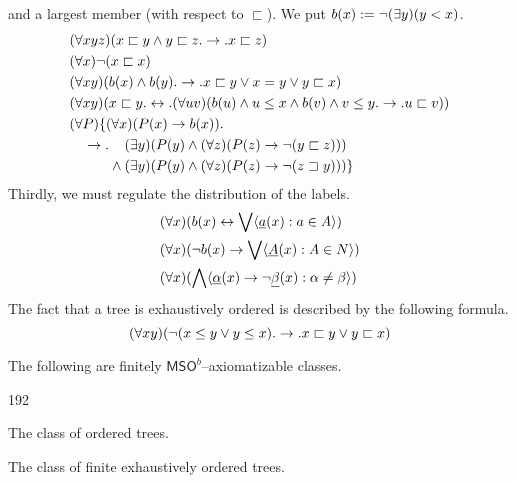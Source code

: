 and a largest member (with respect to $\sqsubset$).
We put $b(x) := \neg (\exists y)(y < x)$.
\begin{subequations}
\begin{align}
& (\forall xyz)(x \sqsubset y \und y \sqsubset z. \pf .x \sqsubset z) \\
& (\forall x)\nicht (x \sqsubset x) \\
& (\forall xy)(b(x) \und b(y) .\pf.
    x \sqsubset y \oder x \doteq y \oder y \sqsubset x) \\
& (\forall xy)(x \sqsubset y. \dpf .
    (\forall uv)(b(u) \und u \leq x \und b(v) \und v \leq y.
    \pf .u \sqsubset v)) 
\\
& (\forall P)\{(\forall x)(P(x) \pf b(x)).  \\\notag
& \quad \pf. \phantom{\mbox{}\und\mbox{}}
    (\exists y)(P(y) \und (\forall z)(P(z) \pf
    \nicht (y \sqsubset z))) \\\notag
& \quad \phantom{\mbox{}\pf. \mbox{}}
    \und (\exists y)(P(y) \und (\forall z)(P(z) \pf
    \nicht (z \sqsupset y)))\}
\end{align}
\end{subequations}
Thirdly,  we must regulate the distribution of the labels.
\begin{subequations}
\begin{align}
& (\forall x)(b(x) \leftrightarrow \bigvee \langle \underline{a}(x) : a \in A\rangle) \\
& (\forall x)(\neg b(x) \rightarrow \bigvee \langle \underline{A}(x) : A \in N\rangle) \\
& (\forall x)(\bigwedge \langle \underline{\alpha}(x) \rightarrow \neg \underline{\beta}(x)
    : \alpha \neq \beta\rangle)
\end{align}
\end{subequations}
The fact that a tree is exhaustively ordered is described by the
following formula.
\begin{equation}
(\forall xy)(\neg (x \leq y \vee y \leq x) .\rightarrow .
    x \sqsubset y \vee y \sqsubset x)
\end{equation}
\begin{prop}
The following are finitely $\mathsf{MSO}^b$--axiomatizable
classes.
\begin{dingautolist}{192}
\item The class of ordered trees.
\item The class of finite exhaustively ordered trees.
\end{dingautolist}
\end{prop}
